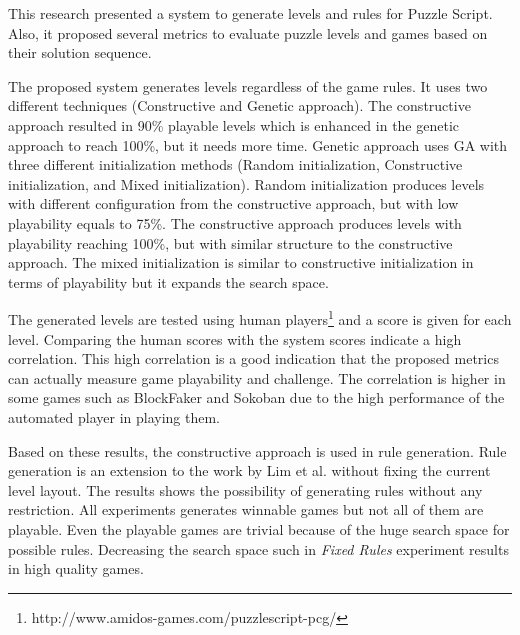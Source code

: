 This research presented a system to generate levels and rules for Puzzle Script. Also, it proposed several metrics to evaluate puzzle levels and games based on their solution sequence.\\\par

The proposed system generates levels regardless of the game rules. It uses two different techniques (Constructive and Genetic approach). The constructive approach resulted in 90\% playable levels which is enhanced in the genetic approach to reach 100\%, but it needs more time. Genetic approach uses GA with three different initialization methods (Random initialization, Constructive initialization, and Mixed initialization). Random initialization produces levels with different configuration from the constructive approach, but with low playability equals to 75\%.  The constructive approach produces levels with playability reaching 100\%, but with similar structure to the constructive approach. The mixed initialization is similar to constructive initialization in terms of playability but it expands the search space.\\\par

The generated levels are tested using human players\footnote{http://www.amidos-games.com/puzzlescript-pcg/} and a score is given for each level. Comparing the human scores with the system scores indicate a high correlation. This high correlation is a good indication that the proposed metrics can actually measure game playability and challenge. The correlation is higher in some games such as BlockFaker and Sokoban due to the high performance of the automated player in playing them.\\\par

Based on these results, the constructive approach is used in rule generation. Rule generation is an extension to the work by Lim et al.\cite{puzzleScriptGeneration} without fixing the current level layout. The results shows the possibility of generating rules without any restriction. All experiments generates winnable games but not all of them are playable. Even the playable games are trivial because of the huge search space for possible rules. Decreasing the search space such in \emph{Fixed Rules} experiment results in high quality games.\\\par

